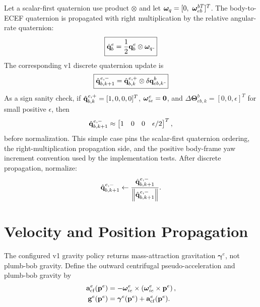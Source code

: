 Let a scalar-first quaternion use product $\otimes$ and let
$\boldsymbol\omega_q=[0,\ \omegab_{eb}^{bT}]^T$. The body-to-ECEF quaternion is
propagated with right multiplication by the relative angular-rate quaternion:
\begin{equation}
\boxed{
\dot{\mathbf{q}}_{b}^{e}
=
\frac{1}{2}
\mathbf{q}_b^e
\otimes
\boldsymbol\omega_q.
}
\label{eq:v1_quat_propagation}
\end{equation}
The corresponding v1 discrete quaternion update is
\begin{equation}
\boxed{
\hat{\mathbf{q}}_{b,k+1}^{e,-}
=
\hat{\mathbf{q}}_{b,k}^{e,+}
\otimes
\delta\mathbf{q}_{eb,k}^{b}.
}
\label{eq:v1_discrete_quat_update}
\end{equation}
As a sign sanity check, if $\hat{\mathbf{q}}_{b,k}^{e,+}=[1,0,0,0]^T$,
$\boldsymbol{\omega}_{ie}^{e}=\mathbf{0}$, and
$\Delta\boldsymbol\Theta_{eb,k}^{b}=[0,0,\epsilon]^T$ for small positive
$\epsilon$, then
\begin{equation}
\hat{\mathbf{q}}_{b,k+1}^{e,-}
\approx
\begin{bmatrix}
1 & 0 & 0 & \epsilon/2
\end{bmatrix}^{T},
\label{eq:v1_quaternion_sign_sanity}
\end{equation}
before normalization. This simple case pins the scalar-first quaternion
ordering, the right-multiplication propagation side, and the positive
body-frame yaw increment convention used by the implementation tests.
After discrete propagation, normalize:
\begin{equation}
\hat{\mathbf{q}}_{b,k+1}^{e,-}
\leftarrow
\frac{\hat{\mathbf{q}}_{b,k+1}^{e,-}}{\left\lVert \hat{\mathbf{q}}_{b,k+1}^{e,-} \right\rVert}.
\label{eq:v1_discrete_quat_normalization}
\end{equation}

\section{Velocity and Position Propagation}

The configured v1 gravity policy returns mass-attraction gravitation
$\boldsymbol{\gamma}^{e}$, not plumb-bob gravity. Define the outward
centrifugal pseudo-acceleration and plumb-bob gravity by
\begin{align}
\mathbf{a}_{\mathrm{cf}}^{e}(\mathbf{p}^{e})
&=
-\boldsymbol{\omega}_{ie}^{e}\times
\left(\boldsymbol{\omega}_{ie}^{e}\times\mathbf{p}^{e}\right),\\
\mathbf{g}^{e}(\mathbf{p}^{e})
&=
\boldsymbol{\gamma}^{e}(\mathbf{p}^{e})
+
\mathbf{a}_{\mathrm{cf}}^{e}(\mathbf{p}^{e}).
\label{eq:v1_apparent_gravity_definition}
\end{align}

